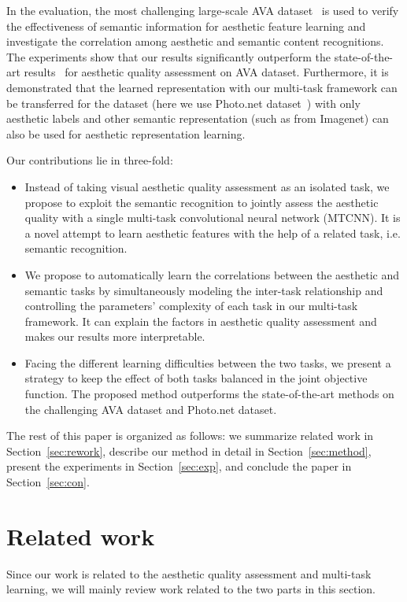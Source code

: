\documentclass[journal]{IEEEtran}
\begin{document}
In the evaluation, the most challenging large-scale AVA dataset~\cite{Murray12} is used to verify the effectiveness of semantic information for aesthetic feature learning and investigate the correlation among aesthetic and semantic content recognitions. The experiments show that our results significantly outperform the state-of-the-art results~\cite{lu14,lu2015deep,mai2016composition} for aesthetic quality assessment on AVA dataset. Furthermore, it is demonstrated that the learned representation with our multi-task framework can be transferred for the dataset (here we use Photo.net dataset~\cite{Datta08,Datta06}) with only aesthetic labels and other semantic representation (such as from Imagenet) can also be used for aesthetic representation learning.

Our contributions lie in three-fold:
\begin{itemize}
    \item Instead of taking visual aesthetic quality assessment as an isolated task, we propose to exploit the semantic recognition to jointly assess the aesthetic quality with a single multi-task convolutional neural network (MTCNN). It is a novel attempt to learn aesthetic features with the help of a related task, i.e. semantic recognition.
    \item We propose to automatically learn the correlations between the aesthetic and semantic tasks by simultaneously modeling the inter-task relationship and controlling the parameters' complexity of each task in our multi-task framework. It can explain the factors in aesthetic quality assessment and makes our results more interpretable.
    \item Facing the different learning difficulties between the two tasks, we present a strategy to keep the effect of both tasks balanced in the joint objective function. The proposed method outperforms the state-of-the-art methods on the challenging AVA dataset and Photo.net dataset.
\end{itemize}

The rest of this paper is organized as follows: we summarize related work in Section~\ref{sec:rework}, describe our method in detail in Section~\ref{sec:method}, present the experiments in Section~\ref{sec:exp}, and conclude the paper in Section~\ref{sec:con}.

\section{Related work \label{sec:rework}}
Since our work is related to the aesthetic quality assessment and multi-task learning, we will mainly review work related to the two parts in this section.
\end{document}
